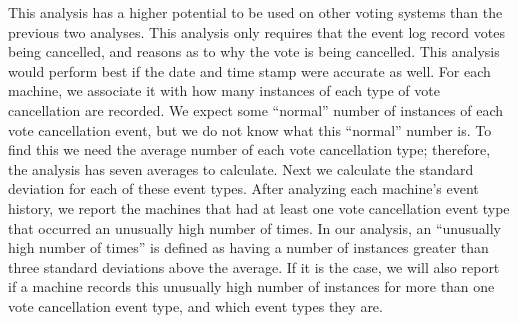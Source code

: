This analysis has a higher potential to be used on other voting systems than the previous two analyses.  This analysis only requires that the event log record votes being cancelled, and reasons as to why the vote is being cancelled.  This analysis would perform best if the date and time stamp were accurate as well.  For each machine, we associate it with how many instances of each type of vote cancellation are recorded.  We expect some \textquotedblleft normal\textquotedblright \hspace{1 mm} number of instances of each vote cancellation event, but we do not know what this \textquotedblleft normal\textquotedblright \hspace{1 mm} number is.  To find this we need the average number of each vote cancellation type; therefore, the analysis has seven averages to calculate.  Next we calculate the standard deviation for each of these event types.  After analyzing each machine’s event history, we report the machines that had at least one vote cancellation event type that occurred an unusually high number of times. In our analysis, an \textquotedblleft unusually high number of times\textquotedblright \hspace{1 mm} is defined as having a number of instances greater than three standard deviations above the average.  If it is the case, we will also report if a machine records this unusually high number of instances for more than one vote cancellation event type, and which event types they are.  

